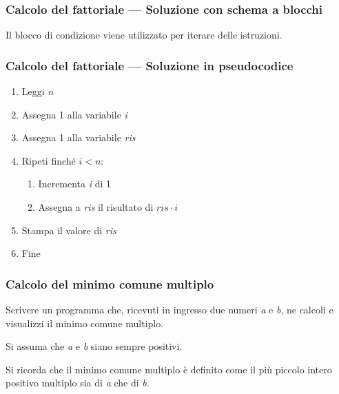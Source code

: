 \documentclass[aspectratio=169,]{beamer}
\begin{document}
\begin{frame}
\frametitle{Calcolo del fattoriale --- Soluzione con schema a blocchi}
		\centering
{}

    Il blocco di condizione viene utilizzato per \alert{iterare} delle istruzioni.
\end{frame}

\begin{frame}
\frametitle{Calcolo del fattoriale --- Soluzione in pseudocodice}
\begin{enumerate}
	\item Leggi \emph{n}
	\item Assegna 1 alla variabile \emph{i}
	\item Assegna 1 alla variabile \emph{ris}
	\item Ripeti finché $i < n$:
	\begin{enumerate}
		\item Incrementa \emph{i} di 1
		\item Assegna a \emph{ris} il risultato di $ris \cdot i$
	\end{enumerate}
	\item Stampa il valore di \emph{ris}
	\item Fine
\end{enumerate}
\end{frame}

\begin{frame}
\frametitle{Calcolo del minimo comune multiplo}
Scrivere un programma che, ricevuti in ingresso due numeri \emph{a} e \emph{b}, ne calcoli e visualizzi il minimo comune multiplo.

Si assuma che \emph{a} e \emph{b} siano sempre positivi.

Si ricorda che il minimo comune multiplo è definito come il più piccolo intero positivo multiplo sia di \emph{a} che di \emph{b}.
\end{frame}
\end{document}
